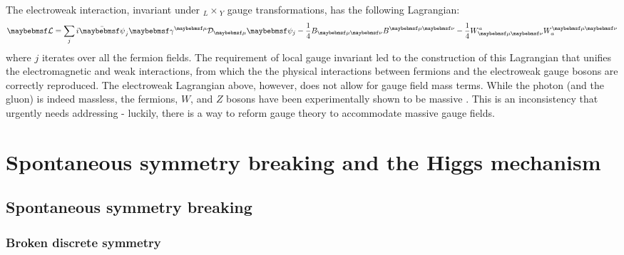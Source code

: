 The electroweak interaction, invariant under $_L\times$$_Y$ gauge transformations, has the following Lagrangian:
\begin{equation}
    \Lagrangian=\sum_{j}i\bar{\psi}_j\gamma^{\mu}\mathcal{D}_{\mu}\psi_j-\dfrac{1}{4}B_{\mu\nu}B^{\mu\nu}-\dfrac{1}{4}W^a_{\mu\nu}W_a^{\mu\nu}
\end{equation}
where $j$ iterates over all the fermion fields. The requirement of local gauge invariant led to the construction of this Lagrangian that unifies the electromagnetic and weak interactions, from which the the physical interactions between fermions and the electroweak gauge bosons are correctly reproduced. The electroweak Lagrangian above, however, does not allow for gauge field mass terms. While the photon (and the gluon) is indeed massless, the fermions, $W$, and $Z$ bosons have been experimentally shown to be massive \cite{missing}. This is an inconsistency that urgently needs addressing - luckily, there is a way to reform gauge theory to accommodate massive gauge fields. 

\section{Spontaneous symmetry breaking and the Higgs mechanism} \label{sec:SSBHiggsMechanism}
\subsection{Spontaneous symmetry breaking}\label{ssec:SSB}
\subsubsection{Broken discrete symmetry}

